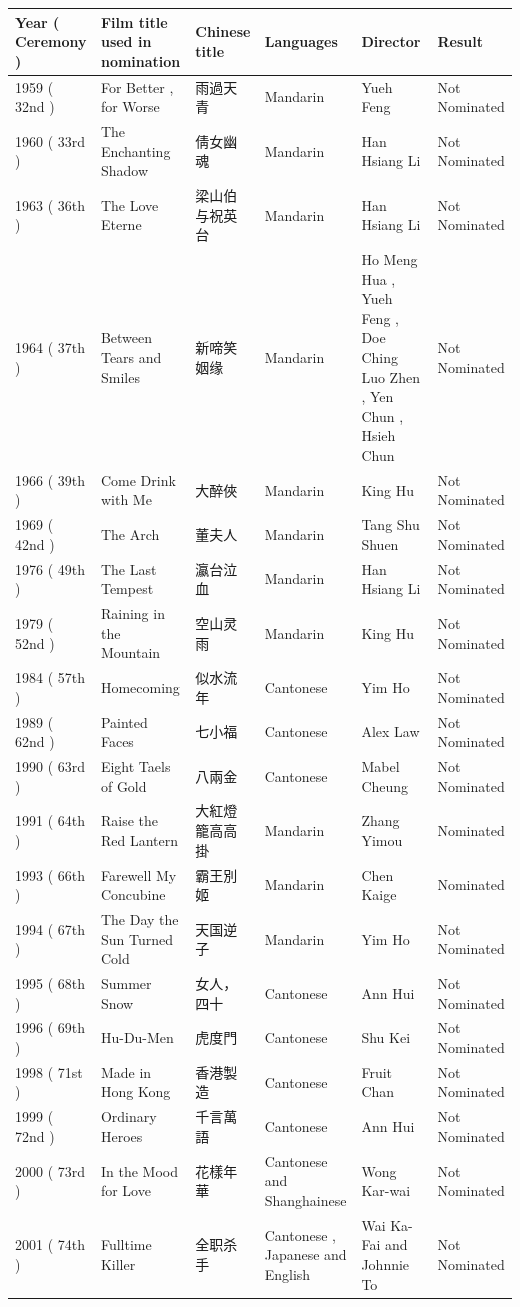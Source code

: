 \documentclass{article}
\begin{document}
\begin{tabular}{llllll}
\toprule
Year ( Ceremony ) & Film title used in nomination & Chinese title & Languages & Director & Result \\
\midrule
1959 ( 32nd ) & For Better , for Worse & 雨過天青 & Mandarin & Yueh Feng & Not Nominated \\
1960 ( 33rd ) & The Enchanting Shadow & 倩女幽魂 & Mandarin & Han Hsiang Li & Not Nominated \\
1963 ( 36th ) & The Love Eterne & 梁山伯与祝英台 & Mandarin & Han Hsiang Li & Not Nominated \\
1964 ( 37th ) & Between Tears and Smiles & 新啼笑姻缘 & Mandarin & Ho Meng Hua , Yueh Feng , Doe Ching Luo Zhen , Yen Chun , Hsieh Chun & Not Nominated \\
1966 ( 39th ) & Come Drink with Me & 大醉俠 & Mandarin & King Hu & Not Nominated \\
1969 ( 42nd ) & The Arch & 董夫人 & Mandarin & Tang Shu Shuen & Not Nominated \\
1976 ( 49th ) & The Last Tempest & 瀛台泣血 & Mandarin & Han Hsiang Li & Not Nominated \\
1979 ( 52nd ) & Raining in the Mountain & 空山灵雨 & Mandarin & King Hu & Not Nominated \\
1984 ( 57th ) & Homecoming & 似水流年 & Cantonese & Yim Ho & Not Nominated \\
1989 ( 62nd ) & Painted Faces & 七小福 & Cantonese & Alex Law & Not Nominated \\
1990 ( 63rd ) & Eight Taels of Gold & 八兩金 & Cantonese & Mabel Cheung & Not Nominated \\
1991 ( 64th ) & Raise the Red Lantern & 大紅燈籠高高掛 & Mandarin & Zhang Yimou & Nominated \\
1993 ( 66th ) & Farewell My Concubine & 霸王別姬 & Mandarin & Chen Kaige & Nominated \\
1994 ( 67th ) & The Day the Sun Turned Cold & 天国逆子 & Mandarin & Yim Ho & Not Nominated \\
1995 ( 68th ) & Summer Snow & 女人，四十 & Cantonese & Ann Hui & Not Nominated \\
1996 ( 69th ) & Hu-Du-Men & 虎度門 & Cantonese & Shu Kei & Not Nominated \\
1998 ( 71st ) & Made in Hong Kong & 香港製造 & Cantonese & Fruit Chan & Not Nominated \\
1999 ( 72nd ) & Ordinary Heroes & 千言萬語 & Cantonese & Ann Hui & Not Nominated \\
2000 ( 73rd ) & In the Mood for Love & 花樣年華 & Cantonese and Shanghainese & Wong Kar-wai & Not Nominated \\
2001 ( 74th ) & Fulltime Killer & 全职杀手 & Cantonese , Japanese and English & Wai Ka-Fai and Johnnie To & Not Nominated \\
\bottomrule
\end{tabular}
\end{document}
